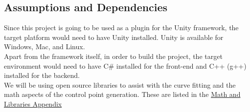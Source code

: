 \subsection{Assumptions and Dependencies}
Since this project is going to be used as a plugin for the Unity framework, the target platform would
need to have Unity installed. Unity is available for Windows, Mac, and Linux.\\
Apart from the framework itself, in order to build the project, the target environment
would need to have C\# installed for the front-end and C++ (g++) installed for the backend.\\
We will be using open source libraries to assist with the curve fitting and the math aspects
of the control point generation. These are listed in the \hyperref[App:AppendixML]{Math and Libraries Appendix}
